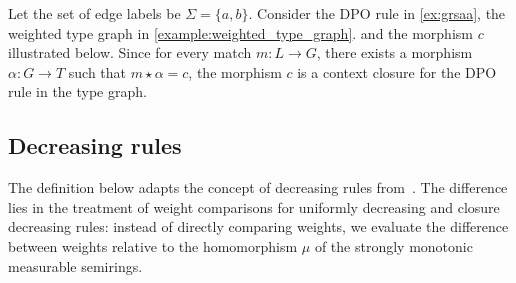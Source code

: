 \begin{example}
    \label{example:context_closure}
    Let the set of edge labels be $\Sigma = \{a,b\}$.
    Consider the DPO rule in \autoref{ex:grsaa}, the weighted type graph in \autoref{example:weighted_type_graph}.
   and the morphism $c$ illustrated below. Since for every match $m : L \to G$, there exists a morphism $\alpha : G \to T$ such that $m \star \alpha = c$, the morphism $c$ is a context closure for the DPO rule in the type graph.
  \begin{center}
  \end{center}
\end{example} 

\subsection{Decreasing rules}
\label{sec:decreasing_rules}
The definition below adapts the concept of decreasing rules from~\cite{endrullis2024generalized_arxiv_v2}. The difference lies in the treatment of weight comparisons for uniformly decreasing and closure decreasing rules: instead of directly comparing weights, we evaluate the difference between weights relative to the homomorphism $\mu$ of the strongly monotonic measurable semirings.

